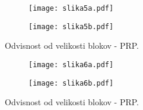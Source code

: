 \documentclass[a4paper]{article}
\begin{document}
    \begin{figure}
        \centering
        \begin{subfigure}{\textwidth}
            \texttt{[image: slika5a.pdf]}
        \end{subfigure}
        \begin{subfigure}{\textwidth}
            \texttt{[image: slika5b.pdf]}
        \end{subfigure}
        \caption{Odvisnost od velikosti blokov - PRP.}
        \label{slika5}
    \end{figure}

    \begin{figure}
        \centering
        \begin{subfigure}{\textwidth}
            \texttt{[image: slika6a.pdf]}
        \end{subfigure}
        \begin{subfigure}{\textwidth}
            \texttt{[image: slika6b.pdf]}
        \end{subfigure}
        \caption{Odvisnost od velikosti blokov - PRP.}
        \label{slika6}
    \end{figure}
\end{document}

